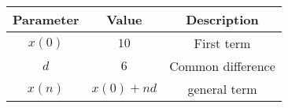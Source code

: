 \begin{tabular}{|c|c|c|}
    \hline
    \textbf{Parameter} & \textbf{Value} & \textbf{Description} \\
    \hline
    $x(0)$ & $10$ & First term \\
    \hline
    $d$ & $6$ & Common difference \\
    \hline 
    $x(n)$ & $x(0)+nd$ & general term \\
    \hline 
\end{tabular}

